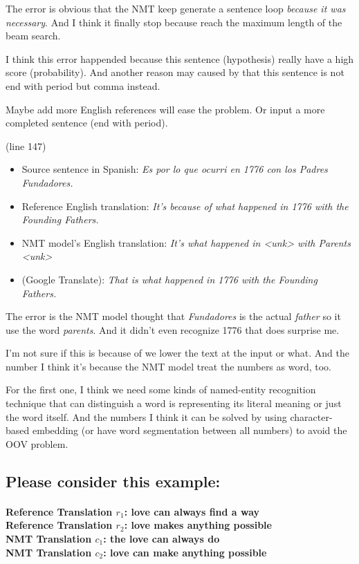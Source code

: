 \documentclass[12pt, letterpaper]{article}
\begin{document}
The error is obvious that the NMT keep generate a sentence loop \textit{because it was necessary}. And I think it finally stop because reach the maximum length of the beam search.

I think this error happended because this sentence (hypothesis) really have a high score (probability). And another reason may caused by that this sentence is not end with period but comma instead.

Maybe add more English references will ease the problem. Or input a more completed sentence (end with period).

\bigskip

\noindent(line 147)

\begin{itemize}
  \item Source sentence in Spanish: \textit{Es por lo que ocurri en 1776 con los Padres Fundadores.}
  \item Reference English translation: \textit{It's because of what happened in 1776  with the Founding Fathers.}
  \item NMT model's English translation: \textit{It's what happened in <unk> with Parents <unk>}
  \item (Google Translate): \textit{That is what happened in 1776 with the Founding Fathers.}
\end{itemize}

The error is the NMT model thought that \textit{Fundadores} is the actual \textit{father} so it use the word \textit{parents}. And it didn't even recognize 1776 that does surprise me.

I'm not sure if this is because of we lower the text at the input or what. And the number I think it's because the NMT model treat the numbers as word, too.

For the first one, I think we need some kinds of named-entity recognition technique that can distinguish a word is representing its literal meaning or just the word itself. And the numbers I think it can be solved by using character-based embedding (or have word segmentation between all numbers) to avoid the OOV problem.

\subsection{Please consider this example:}
\paragraph{Reference Translation $r_1$: love can always find a way \\
Reference Translation $r_2$: love makes anything possible \\
NMT Translation $c_1$: the love can always do \\
NMT Translation $c_2$: love can make anything possible}
\end{document}
